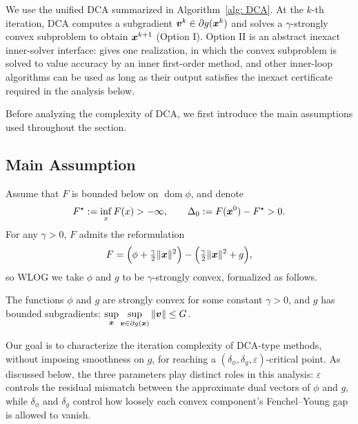 We use the unified DCA summarized in Algorithm~\ref{alg: DCA}. At the
$k$-th iteration, DCA computes a subgradient $\bm{v}^k \in \partial g(\bm{x}^k)$
and solves a $\gamma$-strongly convex subproblem to obtain $\bm{x}^{k+1}$
(Option I). Option II is an abstract inexact inner-solver interface:
 gives one realization, in which the convex
subproblem is solved to value accuracy by an inner first-order method,
and other inner-loop algorithms can be used as long as their output
satisfies the inexact certificate required in the analysis below.

Before analyzing the complexity of DCA, we first introduce the main
assumptions used throughout the section.

\subsection{Main Assumption}
Assume that $F$ is bounded below on $\operatorname{dom}\phi$, and denote
\[
F^\star:=\inf\limits_x F(x)>-\infty,
\qquad
\Delta_0:=F(\bm{x}^0)-F^\star > 0.
\]
For any $\gamma>0$, $F$ admits the reformulation
\[
F = \Big(\phi+\tfrac{\gamma}{2}\|\bm{x}\|^2\Big) - \Big(\tfrac{\gamma}{2}\|\bm{x}\|^2+g\Big),
\]
so WLOG we take $\phi$ and $g$ to be $\gamma$-strongly convex, formalized as follows.

\begin{assumption}
\label{ass:strong-convexity-dc}
The functions $\phi$ and $g$ are strongly convex for some constant
$\gamma>0$, and $g$ has bounded subgradients:
$\sup\limits_{\bm{x}}\sup\limits_{\bm{v}\in\partial g(\bm{x})}\|\bm{v}\|\le G$.
\end{assumption}

Our goal is to characterize the iteration complexity of DCA-type methods, without imposing smoothness on $g$, for reaching a $(\delta_\phi,\delta_g,\varepsilon)$-critical
point. As discussed below, the three parameters play distinct roles in this analysis:
$\varepsilon$ controls the residual mismatch between the approximate dual
vectors of $\phi$ and $g$, while $\delta_\phi$ and $\delta_g$ control how
loosely each convex component's Fenchel--Young gap is allowed to vanish.

